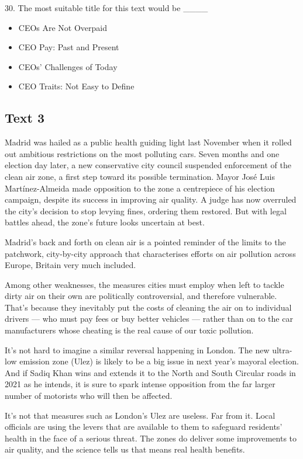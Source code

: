 \documentclass[UTF8,11pt]{ctexart}
\begin{document}
30. The most suitable title for this text would be \_\_\_\_


\begin{itemize}[leftmargin=2em,itemsep=.2em,topsep=.4em]\item[A.] CEOs Are Not Overpaid
\item[B.] CEO Pay: Past and Present
\item[C.] CEOs’ Challenges of Today
\item[D.] CEO Traits: Not Easy to Define
\end{itemize}

\subsection*{\textbf{Text 3}}


Madrid was hailed as a public health guiding light last November when it rolled out ambitious restrictions on the most polluting cars. Seven months and one election day later, a new conservative city council suspended enforcement of the clean air zone, a first step toward its possible termination. Mayor José Luis Martínez-Almeida made opposition to the zone a centrepiece of his election campaign, despite its success in improving air quality. A judge has now overruled the city’s decision to stop levying fines, ordering them restored. But with legal battles ahead, the zone’s future looks uncertain at best.


Madrid’s back and forth on clean air is a pointed reminder of the limits to the patchwork, city-by-city approach that characterises efforts on air pollution across Europe, Britain very much included.


Among other weaknesses, the measures cities must employ when left to tackle dirty air on their own are politically controversial, and therefore vulnerable. That’s because they inevitably put the costs of cleaning the air on to individual drivers — who must pay fees or buy better vehicles — rather than on to the car manufacturers whose cheating is the real cause of our toxic pollution.


It’s not hard to imagine a similar reversal happening in London. The new ultra-low emission zone (Ulez) is likely to be a big issue in next year’s mayoral election. And if Sadiq Khan wins and extends it to the North and South Circular roads in 2021 as he intends, it is sure to spark intense opposition from the far larger number of motorists who will then be affected.


It’s not that measures such as London’s Ulez are useless. Far from it. Local officials are using the levers that are available to them to safeguard residents’ health in the face of a serious threat. The zones do deliver some improvements to air quality, and the science tells us that means real health benefits.
\end{document}
